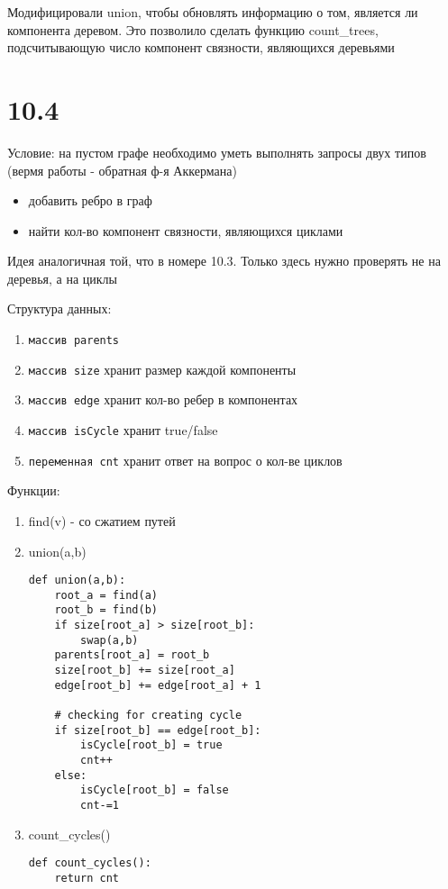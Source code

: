 \documentclass[12pt]{article}
\begin{document}
Модифицировали union, чтобы обновлять информацию о том, является ли компонента деревом. Это позволило сделать функцию count\_trees, подсчитывающую число компонент связности, являющихся деревьями

\section{10.4}
Условие: на пустом графе необходимо уметь выполнять запросы двух типов (вермя работы - обратная ф-я Аккермана)
\begin{itemize}
    \item добавить ребро в граф
    \item найти кол-во компонент связности, являющихся циклами
\end{itemize}

Идея аналогичная той, что в номере 10.3. Только здесь нужно проверять не на деревья, а на циклы 

Структура данных:
\begin{enumerate}
    \item \texttt{массив parents} 
    \item \texttt{массив size} хранит размер каждой компоненты
    \item \texttt{массив edge} хранит кол-во ребер в компонентах
    \item \texttt{массив isCycle} хранит true/false 
    \item \texttt{переменная cnt} хранит ответ на вопрос о кол-ве циклов
\end{enumerate}

Функции:
\begin{enumerate}
    \item find(v) - со сжатием путей
    \item union(a,b)
    \begin{lstlisting}
def union(a,b):
    root_a = find(a)
    root_b = find(b)
    if size[root_a] > size[root_b]:
        swap(a,b)
    parents[root_a] = root_b
    size[root_b] += size[root_a]
    edge[root_b] += edge[root_a] + 1

    # checking for creating cycle
    if size[root_b] == edge[root_b]:
        isCycle[root_b] = true
        cnt++
    else:
        isCycle[root_b] = false
        cnt-=1
    \end{lstlisting}   
    \item count\_cycles()
    \begin{lstlisting}
def count_cycles():
    return cnt
    \end{lstlisting}
\end{enumerate}
\end{document}
